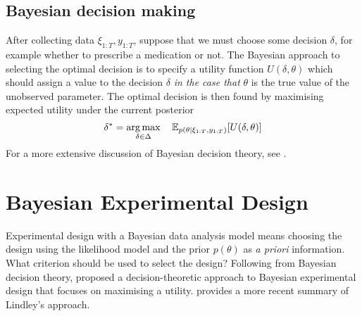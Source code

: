 \documentclass[a4paper, 10pt]{report}
\theoremstyle{plain}
\begin{document}
	
	
	\newcommand\decision{\delta}
	\newcommand\decisionspace{\Delta}
	\subsection{Bayesian decision making}
	\label{sec:decision}
	After collecting data $\xi_{1:T},y_{1:T}$, suppose that we must choose some decision $\decision$, for example whether to prescribe a medication or not.
	The Bayesian approach to selecting the optimal decision \citep{lindley1972,robert2007bayesian} is to specify a utility function $U(\decision, \theta)$ which should assign a value to the decision $\decision$ \emph{in the case that} $\theta$ is the true value of the unobserved parameter.
	The optimal decision is then found by maximising expected utility under the current posterior
	\begin{equation}
	\decision^* = \argmax_{\decision\in\decisionspace} \quad \E_{p(\theta|\xi_{1:T},y_{1:T})}[U(\decision,\theta)]
	\end{equation}
	For a more extensive discussion of Bayesian decision theory, see \citet{berger2013statistical}.
	
	
	\section{Bayesian Experimental Design}
	\label{sec:bed}
	Experimental design with a Bayesian data analysis model means choosing the design using the likelihood model and the prior $p(\theta)$ as \emph{a priori} information.
	What criterion should be used to select the design?
	Following from Bayesian decision theory, \citet{lindley1972} proposed a decision-theoretic approach to Bayesian experimental design that focuses on maximising a utility. \citet{chaloner1995} provides a more recent summary of Lindley's approach.
	
\end{document}
